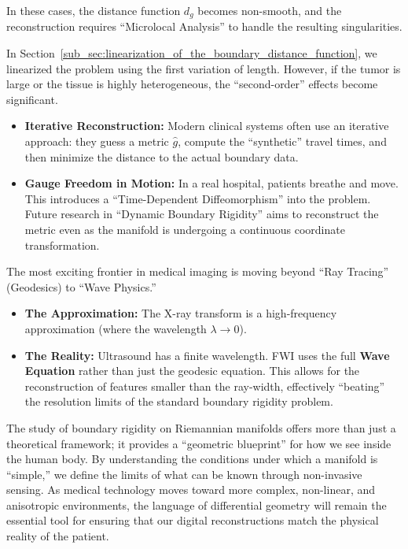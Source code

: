 In these cases, the distance function $d_g$ becomes non-smooth, and the reconstruction requires ``Microlocal Analysis'' to handle the resulting singularities.

In Section~\ref{sub_sec:linearization_of_the_boundary_distance_function}, we linearized the problem using the first variation of length. However, if the tumor is large or the tissue is highly heterogeneous, the ``second-order'' effects become significant.

\begin{itemize}
  \item \textbf{Iterative Reconstruction:} Modern clinical systems often use an iterative approach: they guess a metric $\hat{g}$, compute the ``synthetic'' travel times, and then minimize the distance to the actual boundary data.
  \item \textbf{Gauge Freedom in Motion:} In a real hospital, patients breathe and move. This introduces a ``Time-Dependent Diffeomorphism'' into the problem. Future research in ``Dynamic Boundary Rigidity'' aims to reconstruct the metric even as the manifold is undergoing a continuous coordinate transformation.
\end{itemize}

The most exciting frontier in medical imaging is moving beyond ``Ray Tracing'' (Geodesics) to ``Wave Physics.''

\begin{itemize}
  \item \textbf{The Approximation:} The X-ray transform is a high-frequency approximation (where the wavelength $\lambda \to 0$).
  \item \textbf{The Reality:} Ultrasound has a finite wavelength. FWI uses the full \textbf{Wave Equation} rather than just the geodesic equation. This allows for the reconstruction of features smaller than the ray-width, effectively ``beating'' the resolution limits of the standard boundary rigidity problem.
\end{itemize}

The study of boundary rigidity on Riemannian manifolds offers more than just a theoretical framework; it provides a ``geometric blueprint'' for how we see inside the human body. By understanding the conditions under which a manifold is ``simple,'' we define the limits of what can be known through non-invasive sensing. As medical technology moves toward more complex, non-linear, and anisotropic environments, the language of differential geometry will remain the essential tool for ensuring that our digital reconstructions match the physical reality of the patient.
